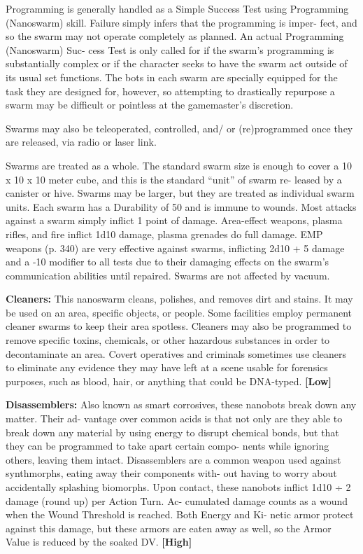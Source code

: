 Programming is generally handled as a Simple 
Success Test using Programming (Nanoswarm) skill. 
Failure simply infers that the programming is imper-
fect, and so the swarm may not operate completely as 
planned. An actual Programming (Nanoswarm) Suc-
cess Test is only called for if the swarm's programming 
is substantially complex or if the character seeks to 
have the swarm act outside of its usual set functions. 
The bots in each swarm are specially equipped for the 
task they are designed for, however, so attempting 
to drastically repurpose a swarm may be difficult or 
pointless at the gamemaster's discretion.

Swarms may also be teleoperated, controlled, and/
or (re)programmed once they are released, via radio 
or laser link.

Swarms are treated as a whole. The standard 
swarm size is enough to cover a 10 x 10 x 10 meter 
cube, and this is the standard ``unit'' of swarm re-
leased by a canister or hive. Swarms may be larger, 
but they are treated as individual swarm units. Each 
swarm has a Durability of 50 and is immune to 
wounds. Most attacks against a swarm simply inflict 
1 point of damage. Area-effect weapons, plasma rifles, 
and fire inflict 1d10 damage, plasma grenades do full 
damage. EMP weapons (p. 340) are very effective 
against swarms, inflicting 2d10 + 5 damage and a -10 
modifier to all tests due to their damaging effects on 
the swarm's communication abilities until repaired. 
Swarms are not affected by vacuum.

\textbf{Cleaners:} This nanoswarm cleans, polishes, and 
removes dirt and stains. It may be used on an area, 
specific objects, or people. Some facilities employ 
permanent cleaner swarms to keep their area spotless. 
Cleaners may also be programmed to remove specific 
toxins, chemicals, or other hazardous substances in 
order to decontaminate an area. Covert operatives 
and criminals sometimes use cleaners to eliminate 
any evidence they may have left at a scene usable for 
forensics purposes, such as blood, hair, or anything 
that could be DNA-typed. \textbf{[Low]}

\textbf{Disassemblers:} Also known as smart corrosives, 
these nanobots break down any matter. Their ad-
vantage over common acids is that not only are 
they able to break down any material by using 
energy to disrupt chemical bonds, but that they 
can be programmed to take apart certain compo-
nents while ignoring others, leaving them intact. 
Disassemblers are a common weapon used against 
synthmorphs, eating away their components with-
out having to worry about accidentally splashing 
biomorphs. Upon contact, these nanobots inflict 
1d10 ÷ 2 damage (round up) per Action Turn. Ac-
cumulated damage counts as a wound when the 
Wound Threshold is reached. Both Energy and Ki-
netic armor protect against this damage, but these 
armors are eaten away as well, so the Armor Value 
is reduced by the soaked DV. \textbf{[High]}

